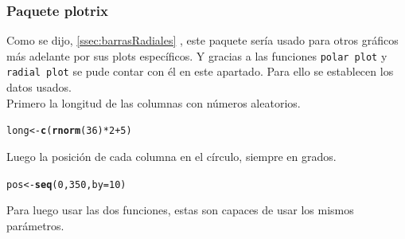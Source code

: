 \documentclass{article}\usepackage[]{graphicx}\usepackage[]{color}
\makeatletter
\newcommand{\hlnum}[1]{\textcolor[rgb]{0.686,0.059,0.569}{#1}}%
\newcommand{\hlopt}[1]{\textcolor[rgb]{0,0,0}{#1}}%
\newcommand{\hlstd}[1]{\textcolor[rgb]{0.345,0.345,0.345}{#1}}%
\newcommand{\hlkwb}[1]{\textcolor[rgb]{0.69,0.353,0.396}{#1}}%
\newcommand{\hlkwc}[1]{\textcolor[rgb]{0.333,0.667,0.333}{#1}}%
\newcommand{\hlkwd}[1]{\textcolor[rgb]{0.737,0.353,0.396}{\textbf{#1}}}%
\newenvironment{kframe}{%
 \def\at@end@of@kframe{}%
 \ifinner\ifhmode%
  \def\at@end@of@kframe{\end{minipage}}%
  \begin{minipage}{\columnwidth}%
 \fi\fi%
 \def\FrameCommand##1{\hskip\@totalleftmargin \hskip-\fboxsep
 \colorbox{shadecolor}{##1}\hskip-\fboxsep
     \hskip-\linewidth \hskip-\@totalleftmargin \hskip\columnwidth}%
 \MakeFramed {\advance\hsize-\width
   \@totalleftmargin\z@ \linewidth\hsize
   \@setminipage}}%
 {\par\unskip\endMakeFramed%
 \at@end@of@kframe}
\newenvironment{knitrout}{}{} %
\makeatother
\begin{document}
\subsubsection{Paquete plotrix}
Como se dijo, \autoref{ssec:barrasRadiales}
, este paquete ser\'ia usado para otros gr\'aficos m\'as adelante por sus plots espec\'ificos. Y gracias a las funciones \texttt{polar plot} y \texttt{radial plot} se pude contar con \'el en este apartado. 
Para ello se establecen los datos usados.~\\
Primero la longitud de las columnas con n\'umeros aleatorios.
\begin{knitrout}
\color{fgcolor}\begin{kframe}
\begin{alltt}
\hlstd{long} \hlkwb{<-} \hlkwd{c}\hlstd{(}\hlkwd{rnorm}\hlstd{(}\hlnum{36}\hlstd{)}\hlopt{*}\hlnum{2}\hlopt{+}\hlnum{5}\hlstd{)}
\end{alltt}
\end{kframe}
\end{knitrout}
Luego la posici\'on de cada columna en el c\'irculo, siempre en grados.
\begin{knitrout}
\color{fgcolor}\begin{kframe}
\begin{alltt}
\hlstd{pos} \hlkwb{<-} \hlkwd{seq}\hlstd{(}\hlnum{0}\hlstd{,}\hlnum{350}\hlstd{,}\hlkwc{by}\hlstd{=}\hlnum{10}\hlstd{)}
\end{alltt}
\end{kframe}
\end{knitrout}
Para luego usar las dos funciones, estas son capaces de usar los mismos par\'ametros.
\end{document}
